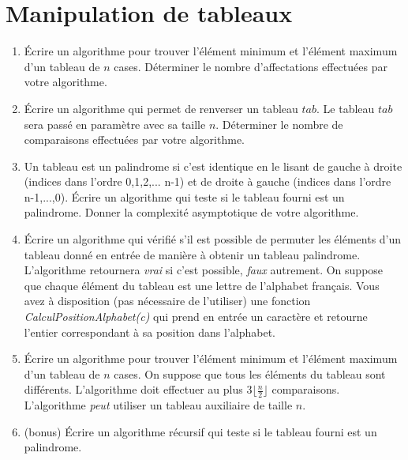 \documentclass[10pt,a4paper]{article}
\begin{document}
\section{Manipulation de tableaux}
\begin{enumerate}
	\item Écrire un algorithme pour trouver l'élément minimum et l'élément maximum d'un tableau de $n$ cases. Déterminer le nombre d'affectations effectuées par votre algorithme.


	\item Écrire un algorithme qui permet de renverser un tableau $tab$. Le tableau $tab$ sera passé en paramètre avec sa taille $n$. Déterminer le nombre de comparaisons effectuées par votre algorithme.

	\item  Un tableau est un palindrome si c'est identique en le lisant de gauche à droite (indices dans l’ordre 0,1,2,... n-1) et de droite à gauche (indices dans l'ordre  n-1,...,0). Écrire un algorithme qui teste si le tableau fourni est un palindrome. Donner la complexité asymptotique de votre algorithme.\\



\item Écrire un algorithme qui vérifié s'il est possible de permuter les éléments d'un tableau donné en entrée de manière à obtenir un tableau palindrome. L'algorithme retournera \emph{vrai} si c'est possible, \emph{faux} autrement. On suppose que chaque élément du tableau est une lettre de l'alphabet français. Vous avez à disposition (pas nécessaire de l'utiliser) une fonction \emph{CalculPositionAlphabet(c)} qui prend en entrée un caractère et retourne l'entier correspondant à sa position dans l'alphabet.


\item Écrire un algorithme pour trouver l'élément minimum et l’élément maximum d’un tableau de $n$ cases. On suppose que tous les éléments du tableau sont différents. L'algorithme doit effectuer au plus $3 \lfloor \frac{n}{2} \rfloor$ comparaisons. L'algorithme \emph{peut} utiliser un tableau auxiliaire de taille $n$.\\

    \item (bonus) Écrire un algorithme récursif qui teste si le tableau fourni est un palindrome.

\end{enumerate}
\end{document}
